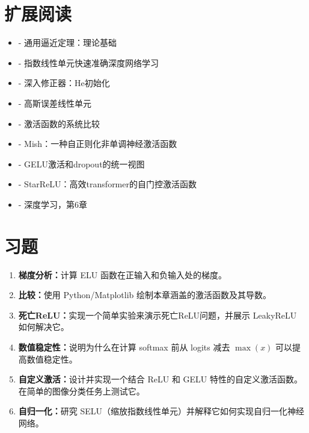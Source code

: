 \section{扩展阅读}

\begin{itemize}
    \item \cite{hornik1991approximation} - 通用逼近定理：理论基础
    \item \cite{clevert2015fast} - 指数线性单元快速准确深度网络学习
    \item \cite{he2015delving} - 深入修正器：He初始化
    \item \cite{hendrycks2016gelu} - 高斯误差线性单元
    \item \cite{ramachandran2017searching} - 激活函数的系统比较
    \item \cite{misra2019mish} - Mish：一种自正则化非单调神经激活函数
    \item \cite{clark2022unified} - GELU激活和dropout的统一视图
    \item \cite{maulik2024starrelu} - StarReLU：高效transformer的自门控激活函数
    \item \cite{goodfellow2016deep} - 深度学习，第6章
\end{itemize}

\section{习题}

\begin{enumerate}
    \item \textbf{梯度分析：}计算 ELU 函数在正输入和负输入处的梯度。
    
    \item \textbf{比较：}使用 Python/Matplotlib 绘制本章涵盖的激活函数及其导数。
    
    \item \textbf{死亡ReLU：}实现一个简单实验来演示死亡ReLU问题，并展示 LeakyReLU 如何解决它。
    
    \item \textbf{数值稳定性：}说明为什么在计算 softmax 前从 logits 减去 $\max(x)$ 可以提高数值稳定性。
    
    \item \textbf{自定义激活：}设计并实现一个结合 ReLU 和 GELU 特性的自定义激活函数。在简单的图像分类任务上测试它。
    
    \item \textbf{自归一化：}研究 SELU（缩放指数线性单元）并解释它如何实现自归一化神经网络。
\end{enumerate}
